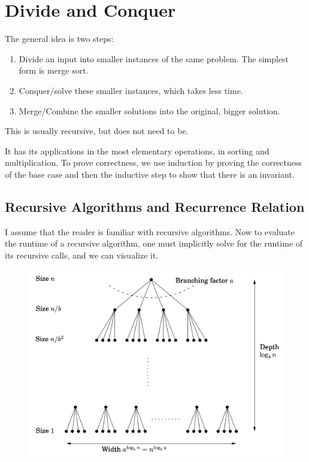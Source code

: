 \section{Divide and Conquer} 

  \begin{definition}
    The general idea is two steps: 
    \begin{enumerate}
      \item Divide an input into smaller instances of the same problem. The simplest form is merge sort. 
      \item Conquer/solve these smaller instances, which takes less time. 
      \item Merge/Combine the smaller solutions into the original, bigger solution. 
    \end{enumerate}
    This is usually recursive, but does not need to be. 
  \end{definition}

  It has its applications in the most elementary operations, in sorting and multiplication. To prove correctness, we use induction by proving the correctness of the base case and then the inductive step to show that there is an invariant. 

\subsection{Recursive Algorithms and Recurrence Relation}

  I assume that the reader is familiar with recursive algorithms. Now to evaluate the runtime of a recursive algorithm, one must implicitly solve for the runtime of its recursive calls, and we can visualize it. 

  \begin{figure}[H]
    \centering 
    \includegraphics[scale=0.4]{img/branching.png}
    \caption{} 
    \label{fig:branching}
  \end{figure}

